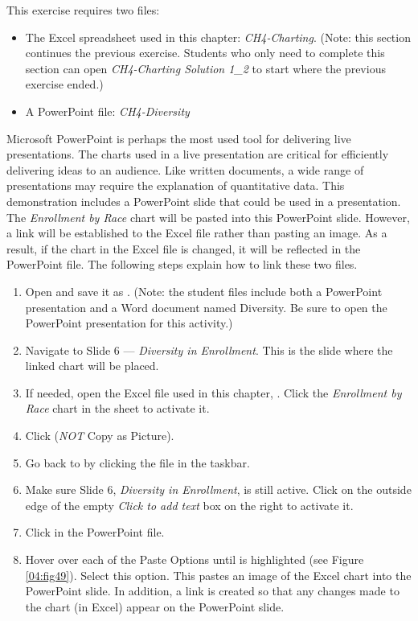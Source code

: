 This exercise requires two files:

\begin{itemize}
	\item The Excel spreadsheet used in this chapter: \textit{CH4-Charting}. (Note: this section continues the previous exercise. Students who only need to complete this section can open \textit{CH4-Charting Solution 1\_2} to start where the previous exercise ended.)
	\item A PowerPoint file: \textit{CH4-Diversity}
\end{itemize}

Microsoft PowerPoint is perhaps the most used tool for delivering live presentations. The charts used in a live presentation are critical for efficiently delivering ideas to an audience. Like written documents, a wide range of presentations may require the explanation of quantitative data. This demonstration includes a PowerPoint slide that could be used in a presentation. The \textit{Enrollment by Race} chart will be pasted into this PowerPoint slide. However, a link will be established to the Excel file rather than pasting an image. As a result, if the chart in the Excel file is changed, it will be reflected in the PowerPoint file. The following steps explain how to link these two files.

\begin{enumbox}
	\begin{enumerate}
		\item Open  and save it as . (Note: the student files include both a PowerPoint presentation and a Word document named Diversity. Be sure to open the PowerPoint presentation for this activity.) 
		\item Navigate to Slide $ 6 $ --- \textit{Diversity in Enrollment}. This is the slide where the linked chart will be placed.
		\item If needed, open the Excel file used in this chapter, . Click the \textit{Enrollment by Race} chart in the  sheet to activate it.
		\item Click  (\textit{NOT} Copy as Picture).
		\item Go back to  by clicking the file in the taskbar.
		\item Make sure Slide 6, \textit{Diversity in Enrollment}, is still active. Click on the outside edge of the empty \textit{Click to add text} box on the right to activate it.
		\item Click  in the PowerPoint file.
		\item Hover over each of the Paste Options until  is highlighted (see Figure \ref{04:fig49}). Select this option. This pastes an image of the Excel chart into the PowerPoint slide. In addition, a link is created so that any changes made to the chart (in Excel) appear on the PowerPoint slide.
	\end{enumerate}
\end{enumbox}
	
